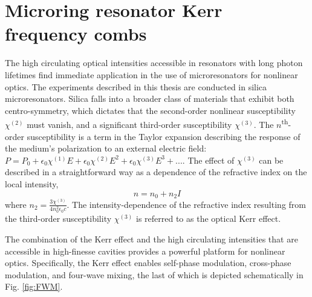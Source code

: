 







\section{Microring resonator Kerr frequency combs}

The high circulating optical intensities accessible in resonators with long photon lifetimes find immediate application in the use of microresonators for nonlinear optics. The experiments described in this thesis are conducted in silica microresonators. Silica falls into a broader class of materials that exhibit both centro-symmetry, which dictates that the second-order nonlinear susceptibility $\chi^{(2)}$ must vanish, and a significant third-order susceptibility $\chi^{(3)}$. The $n$\textsuperscript{th}-order susceptibility is a term in the Taylor expansion describing the response of the medium's polarization to an external electric field\cite{Boyd2003}: $P=P_0+\epsilon_0 \chi^{(1)} E + \epsilon_0 \chi^{(2)} E^2 + \epsilon_0 \chi^{(3)} E^3+...$. The effect of $\chi^{(3)}$ can be described in a straightforward way as a dependence of the refractive index on the local intensity\cite{Agrawal2007},
\begin{equation}
n=n_0+n_2 I \label{eq:KerrIndex}
\end{equation}
where $n_2=\frac{3\chi^{(3)}}{4n_0^2\epsilon_0 c}$\cite{DelCoso2004,Agrawal2007}. The intensity-dependence of the refractive index resulting from the third-order susceptibility $\chi^{(3)}$ is referred to as the optical Kerr effect.

The combination of the Kerr effect and the high circulating intensities that are accessible in high-finesse cavities provides a powerful platform for nonlinear optics. Specifically, the Kerr effect enables self-phase modulation, cross-phase modulation, and four-wave mixing, the last of which is depicted schematically in Fig. \ref{fig:FWM}. 

